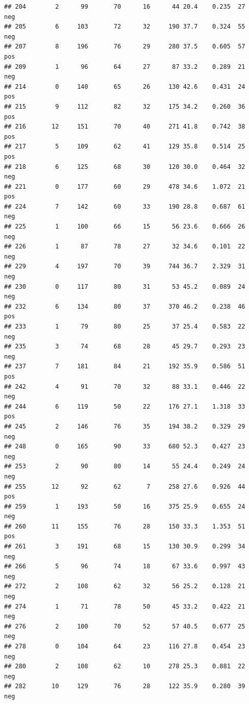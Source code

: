 \documentclass[
]{article}
\begin{document}
\begin{verbatim}
## 204        2      99       70      16      44 20.4    0.235  27      neg
## 205        6     103       72      32     190 37.7    0.324  55      neg
## 207        8     196       76      29     280 37.5    0.605  57      pos
## 209        1      96       64      27      87 33.2    0.289  21      neg
## 214        0     140       65      26     130 42.6    0.431  24      pos
## 215        9     112       82      32     175 34.2    0.260  36      pos
## 216       12     151       70      40     271 41.8    0.742  38      pos
## 217        5     109       62      41     129 35.8    0.514  25      pos
## 218        6     125       68      30     120 30.0    0.464  32      neg
## 221        0     177       60      29     478 34.6    1.072  21      pos
## 224        7     142       60      33     190 28.8    0.687  61      neg
## 225        1     100       66      15      56 23.6    0.666  26      neg
## 226        1      87       78      27      32 34.6    0.101  22      neg
## 229        4     197       70      39     744 36.7    2.329  31      neg
## 230        0     117       80      31      53 45.2    0.089  24      neg
## 232        6     134       80      37     370 46.2    0.238  46      pos
## 233        1      79       80      25      37 25.4    0.583  22      neg
## 235        3      74       68      28      45 29.7    0.293  23      neg
## 237        7     181       84      21     192 35.9    0.586  51      pos
## 242        4      91       70      32      88 33.1    0.446  22      neg
## 244        6     119       50      22     176 27.1    1.318  33      pos
## 245        2     146       76      35     194 38.2    0.329  29      neg
## 248        0     165       90      33     680 52.3    0.427  23      neg
## 253        2      90       80      14      55 24.4    0.249  24      neg
## 255       12      92       62       7     258 27.6    0.926  44      pos
## 259        1     193       50      16     375 25.9    0.655  24      neg
## 260       11     155       76      28     150 33.3    1.353  51      pos
## 261        3     191       68      15     130 30.9    0.299  34      neg
## 266        5      96       74      18      67 33.6    0.997  43      neg
## 272        2     108       62      32      56 25.2    0.128  21      neg
## 274        1      71       78      50      45 33.2    0.422  21      neg
## 276        2     100       70      52      57 40.5    0.677  25      neg
## 278        0     104       64      23     116 27.8    0.454  23      neg
## 280        2     108       62      10     278 25.3    0.881  22      neg
## 282       10     129       76      28     122 35.9    0.280  39      neg

\end{verbatim}
\end{document}
